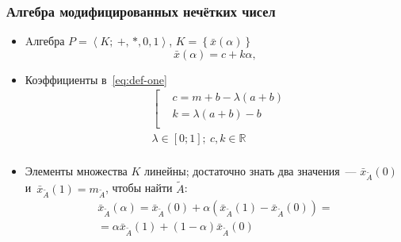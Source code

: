 \documentclass[12pt]{beamer}
\begin{document}

\begin{frame}
  \frametitle{Алгебра модифицированных нечётких чисел}
  \begin{itemize}
    \item Aлгебра $P=\left\langle K ;\ +,\,*, 0, 1 \right\rangle$, $K=\left\lbrace \bar x(\alpha) \right\rbrace$
      \begin{equation}
        \label{eq:def-one}
        \bar{x}\left( \alpha  \right)=c+k\alpha,
      \end{equation}
    \item Коэффициенты в~\eqref{eq:def-one}
      \begin{equation}
        \label{eq:modified-number-from-abm}
        \begin{aligned}
          & \left[ \begin{aligned}
          & c=m+b-\lambda \left( a+b \right) \\ 
          & k=\lambda \left( a+b \right)-b \\ 
        \end{aligned} \right. \\ 
        & \lambda \in \left[ 0;1 \right];\ c,k\in \mathbb{R} \\ 
      \end{aligned}
      \end{equation}
    \item Элементы множества $K$ линейны; достаточно знать два значения~--- $\bar{x}_{\tilde A}\left( 0 \right)$ и~$\bar{x}_{\tilde A}\left( 1 \right)=m_{\tilde A}$, чтобы найти $\tilde{A}$:
      \begin{gather}
        \label{eq:isomorphic-field}
        \bar{x}_{\tilde A}\left( \alpha \right)=\bar{x}_{\tilde A}\left( 0 \right)+\alpha \left(\bar{x}_{\tilde A}\left( 1 \right)-\bar{x}_{\tilde A}\left(0 \right) \right)=\\
        =\alpha \bar{x}_{\tilde A}\left( 1 \right)+\left( 1-\alpha  \right) \bar{x}_{\tilde A}\left( 0 \right)
      \end{gather}
  \end{itemize}
\end{frame}

\end{document}
